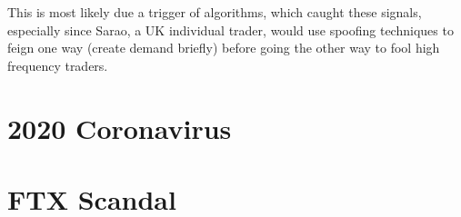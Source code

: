 \documentclass{article}
\begin{document}
  This is most likely due a trigger of algorithms, which caught these signals, especially since Sarao, a UK individual trader, would use spoofing techniques to feign one way (create demand briefly) before going the other way to fool high frequency traders. 


\section{2020 Coronavirus}


\section{FTX Scandal}
\end{document}
